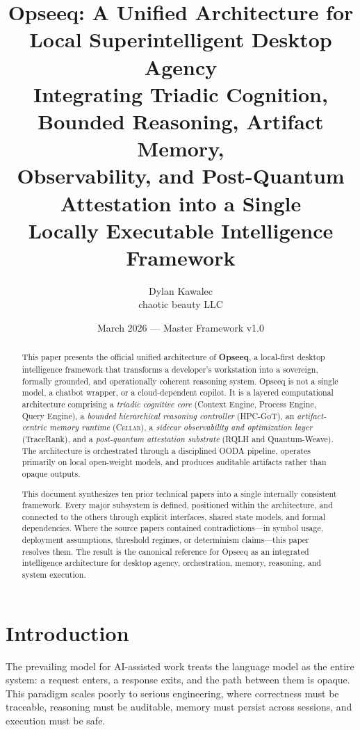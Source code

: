 \documentclass[11pt]{article}
\title{%
  \textbf{Opseeq: A Unified Architecture for\\Local Superintelligent Desktop Agency}\\[0.6em]
  \large Integrating Triadic Cognition, Bounded Reasoning, Artifact Memory,\\
  Observability, and Post-Quantum Attestation into a Single\\
  Locally Executable Intelligence Framework
}
\author{Dylan Kawalec\\chaotic beauty LLC}
\date{March 2026 --- Master Framework v1.0}
\theoremstyle{remark}
\newcommand{\cellar}{\textsc{Cellar}}
\begin{document}
\maketitle

\begin{abstract}
This paper presents the official unified architecture of \textbf{Opseeq}, a local-first desktop intelligence framework that transforms a developer's workstation into a sovereign, formally grounded, and operationally coherent reasoning system. Opseeq is not a single model, a chatbot wrapper, or a cloud-dependent copilot. It is a layered computational architecture comprising a \emph{triadic cognitive core} (Context Engine, Process Engine, Query Engine), a \emph{bounded hierarchical reasoning controller} (HPC-GoT), an \emph{artifact-centric memory runtime} (\cellar{}), a \emph{sidecar observability and optimization layer} (TraceRank), and a \emph{post-quantum attestation substrate} (RQLH and Quantum-Weave). The architecture is orchestrated through a disciplined OODA pipeline, operates primarily on local open-weight models, and produces auditable artifacts rather than opaque outputs.

This document synthesizes ten prior technical papers into a single internally consistent framework. Every major subsystem is defined, positioned within the architecture, and connected to the others through explicit interfaces, shared state models, and formal dependencies. Where the source papers contained contradictions---in symbol usage, deployment assumptions, threshold regimes, or determinism claims---this paper resolves them. The result is the canonical reference for Opseeq as an integrated intelligence architecture for desktop agency, orchestration, memory, reasoning, and system execution.
\end{abstract}

\tableofcontents
\newpage

\section{Introduction}
\label{sec:introduction}

The prevailing model for AI-assisted work treats the language model as the entire system: a request enters, a response exits, and the path between them is opaque. This paradigm scales poorly to serious engineering, where correctness must be traceable, reasoning must be auditable, memory must persist across sessions, and execution must be safe.
\end{document}
